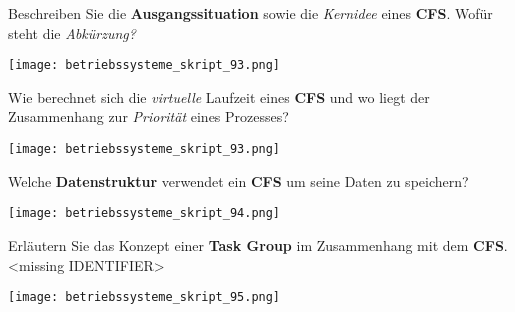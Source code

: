 \documentclass{article}
\begin{document}
\begin{tcolorbox}[colback=white!10!white,colframe=lightgray!75!black,
  savelowerto=\jobname_ex.tex,breakable,enhanced,lines before break=40]

\justifying
Beschreiben Sie die \textbf{Ausgangssituation} sowie die \textit{Kernidee} eines \textbf{CFS}. Wofür steht die \textit{Abkürzung?}

\tcblower

\justifying
\begin{center}
\texttt{[image: betriebssysteme\_skript\_93.png]}
\end{center}

\end{tcolorbox}
\begin{tcolorbox}[colback=white!10!white,colframe=lightgray!75!black,
  savelowerto=\jobname_ex.tex,breakable,enhanced,lines before break=40]

\justifying
Wie berechnet sich die \textit{virtuelle} Laufzeit eines \textbf{CFS} und wo liegt der Zusammenhang zur \textit{Priorität} eines Prozesses?

\tcblower

\justifying
\begin{center}
\texttt{[image: betriebssysteme\_skript\_93.png]}
\end{center}

\end{tcolorbox}
\begin{tcolorbox}[colback=white!10!white,colframe=lightgray!75!black,
  savelowerto=\jobname_ex.tex,breakable,enhanced,lines before break=40]

\justifying
Welche \textbf{Datenstruktur} verwendet ein \textbf{CFS} um seine Daten zu speichern?

\tcblower

\justifying
\begin{center}
\texttt{[image: betriebssysteme\_skript\_94.png]}
\end{center}

\end{tcolorbox}
\begin{tcolorbox}[colback=white!10!white,colframe=lightgray!75!black,
  savelowerto=\jobname_ex.tex,breakable,enhanced,lines before break=40]

\justifying
Erläutern Sie das Konzept einer \textbf{Task Group} im Zusammenhang mit dem \textbf{CFS}.<missing IDENTIFIER>

\tcblower

\justifying
\begin{center}
\texttt{[image: betriebssysteme\_skript\_95.png]}
\end{center}

\end{tcolorbox}
\end{document}

